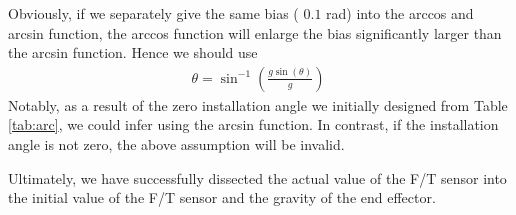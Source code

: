 Obviously, if we separately give the same bias ( $0.1$ rad) into the arccos and arcsin function, the arccos function will enlarge the bias significantly larger than the arcsin function. Hence we should use
\begin{equation}
\begin{split}
\theta = \sin^{-1}\left(\frac{g\sin(\theta)}{g}\right)\
\end{split}
\end{equation}
Notably, as a result of the zero installation angle we initially designed from Table \ref{tab:arc}, we could infer using the arcsin function. In contrast, if the installation angle is not zero, the above assumption will be invalid.
\par
Ultimately, we have successfully dissected the actual value of the F/T sensor into the initial value of the F/T sensor and the gravity of the end effector. 
